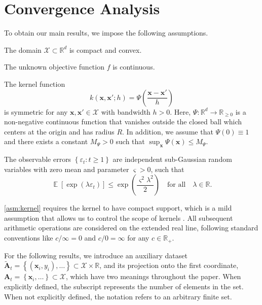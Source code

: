 \documentclass[11pt,en]{elegantpaper}
\newcommand{\domain}{\mathcal{X}}
\newcommand{\x}{\bm{x}}
\newcommand{\A}{\bm{A}}
\newcommand{\1}{\mathds{1}}
\newcommand{\set}[1]{\left\{#1\right\}}
\DeclareMathOperator*{\E}{\mathbb{E}}
\begin{document}
\section{Convergence Analysis}
\label{sec:convergence analysis}

To obtain our main results, we impose the following assumptions.
\begin{assumption}
    \label{asm:domain}
    The domain $\domain \subset \mathbb{R}^d$ is compact and convex.
\end{assumption}

\begin{assumption}
    \label{asm:objective}
    The unknown objective function $f$ is continuous.
\end{assumption}

\begin{assumption}
    \label{asm:kernel}
    The kernel function
    \begin{equation}
        k(\x, \x'; h) = \Psi\left(\dfrac{\x - \x'}{h}\right)
    \end{equation}
    is symmetric for any $\x, \x' \in \domain$ with bandwidth $h > 0$. Here, $\Psi: \mathbb{R}^d \to \mathbb{R}_{\ge 0}$ is a non-negative continuous function that vanishes outside the closed ball which centers at the origin and has radius $R$.
    In addition, we assume that $\Psi(0) \equiv 1$ and there exists a constant $M_{\Psi} > 0$ such that $\sup_{\x} \Psi (\x) \le M_{\Psi}$.
\end{assumption}

\begin{assumption}
    \label{asm:noise}
    The observable errors $\set{\varepsilon_t: t \ge 1}$ are independent sub-Gaussian random variables with zero mean and parameter $\varsigma > 0$, such that
    \begin{equation}
        \E \left[ \exp(\lambda \varepsilon_t) \right] \le \exp\left( \frac{\varsigma^2 \lambda^2}{2} \right) \quad \text{for all} \quad \lambda \in \mathbb{R}.
    \end{equation}
\end{assumption}

\cref{asm:kernel} requires the kernel to have compact support, which is a mild assumption that allows us to control the scope of kernels \cite{linke2023towards}.
All subsequent arithmetic operations are considered on the extended real line, following standard conventions like $c / \infty = 0$ and $c / 0 = \infty$ for any $c \in \mathbb{R}_+$.

For the following results, we introduce an auxiliary dataset $\tilde{\A}_t = \set{(\x_i, y_i), \dots} \subset \domain \times \mathbb{R}$, and its projection onto the first coordinate, $\A_t = \set{\x_i, \dots} \subset \domain$, which have two meanings throughout the paper. When explicitly defined, the subscript represents the number of elements in the set. When not explicitly defined, the notation refers to an arbitrary finite set.
\end{document}
